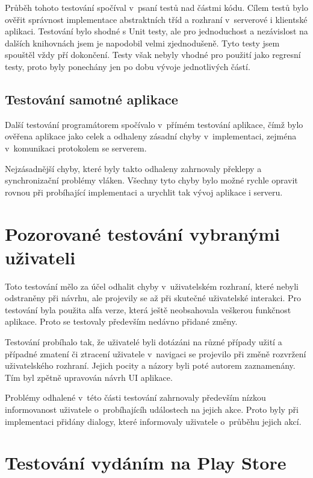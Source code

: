 \documentclass[thesis=B,czech]{FITthesis}[2013/10/20]
\begin{document}
Průběh tohoto testování spočíval v~psaní testů nad částmi kódu. Cílem testů bylo ověřit správnost implementace abstraktních tříd a rozhraní v~serverové i klientské aplikaci. Testování bylo shodné s Unit testy, ale pro jednoduchost a nezávislost na dalších knihovnách jsem je napodobil velmi zjednodušeně. Tyto testy jsem spouštěl vždy pří dokončení. Testy však nebyly vhodné pro použití jako regresní testy, proto byly ponechány jen po dobu vývoje jednotlivých částí.



\subsection{Testování samotné aplikace}

Další testování programátorem spočívalo v~přímém testování aplikace, čímž bylo ověřena aplikace jako celek a odhaleny zásadní chyby v~implementaci, zejména v~komunikaci protokolem se serverem.

Nejzásadnější chyby, které byly takto odhaleny zahrnovaly překlepy a synchronizační problémy vláken. Všechny tyto chyby bylo možné rychle opravit rovnou při probíhající implementaci a urychlit tak vývoj aplikace i serveru.

\section{Pozorované testování vybranými uživateli}

Toto testování mělo za účel odhalit chyby v~uživatelském rozhraní, které nebyli odstraněny při návrhu, ale projevily se až při skutečné uživatelské interakci. Pro testování byla použita alfa verze, která ještě neobsahovala veškerou funkčnost aplikace. Proto se testovaly především nedávno přidané změny.

Testování probíhalo tak, že uživatelé byli dotázáni na různé případy užití a případné zmatení či ztracení uživatele v~navigaci se projevilo při změně rozvržení uživatelského rozhraní. Jejich pocity a názory byli poté autorem zaznamenány. Tím byl zpětně upravován návrh UI aplikace.

Problémy odhalené v~této části testování zahrnovaly především nízkou informovanost uživatele o~probíhajícíh událostech na jejich akce. Proto byly při implementaci přidány dialogy, které informovaly uživatele o~průběhu jejich akcí.

\section{Testování vydáním na Play Store}
\end{document}
